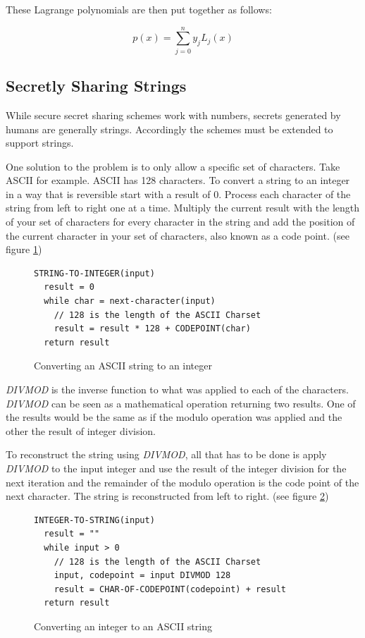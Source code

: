 These Lagrange polynomials are then put together as follows:

$$p(x) = \sum_{j = 0}^{n} y_jL_j(x)$$

\subsection{Secretly Sharing Strings}

While secure secret sharing schemes work with numbers, secrets generated by
humans are generally strings. Accordingly the schemes must be extended to
support strings.

One solution to the problem is to only allow a specific set of characters. Take
ASCII for example. ASCII has 128 characters. To convert a string to an integer
in a way that is reversible start with a result of 0. Process each character of
the string from left to right one at a time. Multiply the current result with
the length of your set of characters for every character in the string and add
the position of the current character in your set of characters, also known as
a code point. (see figure \ref{code:stringToInteger})

\begin{figure}
\begin{lstlisting}
STRING-TO-INTEGER(input)
  result = 0
  while char = next-character(input)
    // 128 is the length of the ASCII Charset
    result = result * 128 + CODEPOINT(char)
  return result
\end{lstlisting}
\caption{Converting an ASCII string to an integer}
\label{code:stringToInteger}
\end{figure}

\textit{DIVMOD} is the inverse function to what was applied to each of the
characters. \textit{DIVMOD} can be seen as a mathematical operation returning
two results. One of the results would be the same as if the modulo operation
was applied and the other the result of integer division.

To reconstruct the string using \textit{DIVMOD}, all that has to be done is
apply \textit{DIVMOD} to the input integer and use the result of the integer
division for the next iteration and the remainder of the modulo operation is
the code point of the next character. The string is reconstructed from left to
right. (see figure \ref{code:integerToString})

\begin{figure}
\begin{lstlisting}
INTEGER-TO-STRING(input)
  result = ""
  while input > 0
    // 128 is the length of the ASCII Charset
    input, codepoint = input DIVMOD 128
    result = CHAR-OF-CODEPOINT(codepoint) + result
  return result
\end{lstlisting}
\caption{Converting an integer to an ASCII string}
\label{code:integerToString}
\end{figure}

